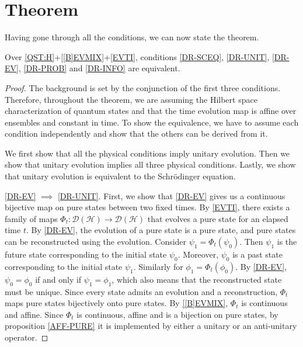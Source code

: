 \documentclass[entropy,article,submit,moreauthors]{Definitions/mdpi}
\begin{document}
\section{Theorem}

Having gone through all the conditions, we can now state the theorem.

\begin{Theorem}
	Over \ref{QST:H}+\ref{[B]EVMIX}+\ref{EVTI}, conditions \ref{DR-SCEQ}, \ref{DR-UNIT}, \ref{DR-EV}, \ref{DR-PROB} and \ref{DR-INFO} are equivalent.
\end{Theorem}

\begin{proof}
	The background is set by the conjunction of the first three conditions. Therefore, throughout the theorem, we are assuming the Hilbert space characterization of quantum states and that the time evolution map is affine over ensembles and constant in time. To show the equivalence, we have to assume each condition independently and show that the others can be derived from it.
	
	We first show that all the physical conditions imply unitary evolution. Then we show that unitary evolution implies all three physical conditions. Lastly, we show that unitary evolution is equivalent to the Schrödinger equation.
	
	\ref{DR-EV} $\implies$ \ref{DR-UNIT}. First, we show that \ref{DR-EV} gives us a continuous bijective map on pure states between two fixed times. By \ref{EVTI}, there exists a family of maps $\Phi_t : \mathcal{D}(\mathcal{H}) \to \mathcal{D}(\mathcal{H})$ that evolves a pure state for an elapsed time $t$. By \ref{DR-EV}, the evolution of a pure state is a pure state, and pure states can be reconstructed using the evolution. Consider $\psi_1 = \Phi_t(\psi_0)$. Then $\psi_1$ is the future state corresponding to the initial state $\psi_0$. Moreover, $\psi_0$ is a past state corresponding to the initial state $\psi_1$. Similarly for $\phi_1 = \Phi_t(\phi_0)$. By \ref{DR-EV}, $\psi_0 = \phi_0$ if and only if $\psi_1 = \phi_1$, which also means that the reconstructed state must be unique. Since every state admits an evolution and a reconstruction, $\Phi_t$ maps pure states bijectively onto pure states. By \ref{[B]EVMIX}, $\Phi_t$ is continuous and affine. Since $\Phi_t$ is continuous, affine and is a bijection on pure states, by proposition \ref{AFF-PURE} it is implemented by either a unitary or an anti-unitary operator.
	

\end{proof}
\end{document}
